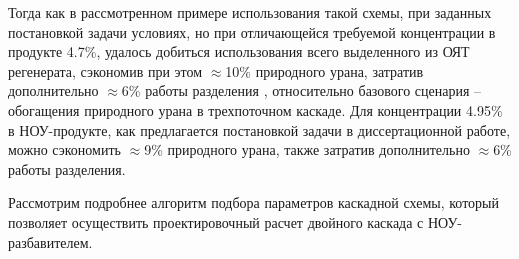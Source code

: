 Тогда как в рассмотренном примере использования такой схемы, при заданных постановкой задачи условиях, но при отличающейся требуемой концентрации в продукте 4.7\%, удалось добиться использования всего выделенного из ОЯТ регенерата, сэкономив при этом $\approx$10\% природного урана, затратив дополнительно $\approx$6\% работы разделения \cite{gusevMultycascadeEnrichmentSchemes2020}, относительно базового сценария -- обогащения природного урана в трехпоточном каскаде. Для концентрации 4.95\% в НОУ-продукте, как предлагается постановкой задачи в диссертационной работе, можно сэкономить  $\approx$9\% природного урана, также затратив дополнительно $\approx$6\% работы разделения.

Рассмотрим подробнее алгоритм подбора параметров каскадной схемы, который позволяет осуществить проектировочный расчет двойного каскада с НОУ-разбавителем.

